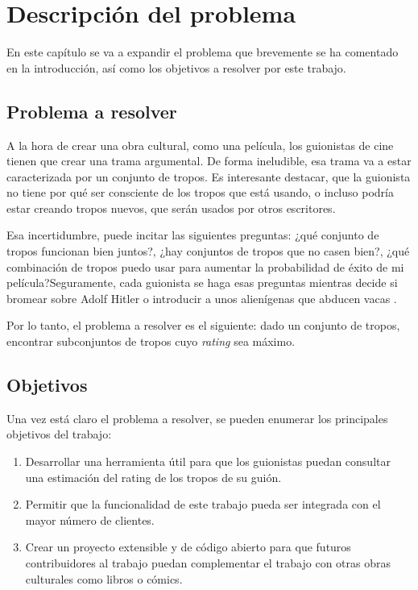 \chapter{Descripción del problema}

En este capítulo se va a expandir el problema que brevemente se ha comentado en
la introducción, así como los objetivos a resolver por este trabajo.

\section{Problema a resolver}

A la hora de crear una obra cultural, como una película, los guionistas de cine
tienen que crear una trama argumental. De forma ineludible, esa trama va a
estar caracterizada por un conjunto de tropos. Es interesante destacar, que la
guionista no tiene por qué ser consciente de los tropos que está usando, o incluso podría estar creando tropos nuevos, que serán usados por otros
escritores.

Esa incertidumbre, puede incitar las siguientes preguntas: ¿qué conjunto de
tropos funcionan bien juntos?, ¿hay conjuntos de tropos que no casen bien?,
¿qué combinación de tropos puedo usar para aumentar la probabilidad de éxito de
mi película?Seguramente, cada guionista se haga esas preguntas mientras decide
si bromear sobre Adolf Hitler \cite{tropo:AdolfHitlarious} o introducir a unos
alienígenas que abducen vacas \cite{tropo:AliensStealCattle}.

Por lo tanto, el problema a resolver es el siguiente: dado un conjunto de
tropos, encontrar subconjuntos de tropos cuyo \emph{rating} sea máximo.

\section{Objetivos} \label{section:goals}

Una vez está claro el problema a resolver, se pueden enumerar los principales
objetivos del trabajo:

\begin{enumerate}
    \item Desarrollar una herramienta útil para que los guionistas puedan
          consultar una estimación del rating de los tropos de su guión.
    \item Permitir que la funcionalidad de este trabajo pueda ser integrada con
          el mayor número de clientes.
    \item Crear un proyecto extensible y de código abierto para que futuros
          contribuidores al trabajo puedan complementar el trabajo con otras obras
          culturales como libros o cómics.
\end{enumerate}